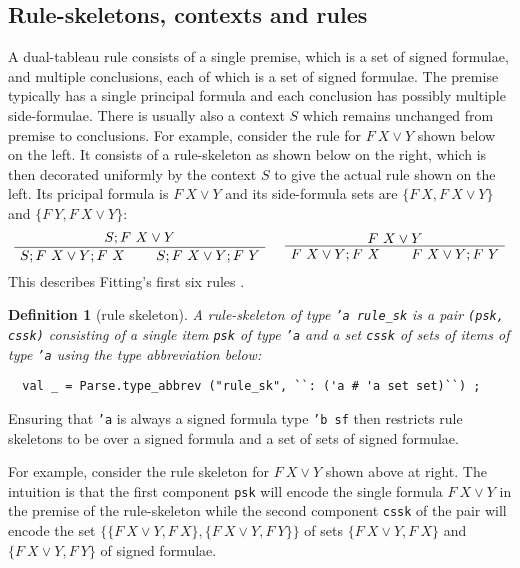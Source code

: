 \documentclass[a4paper]{article}
\newtheorem{definition}{Definition}
\begin{document}
\subsection{Rule-skeletons, contexts and rules}
A dual-tableau rule consists of a single premise,
which is a set of signed formulae,
and multiple conclusions, each of which is a set of signed formulae.
The premise typically has a single principal formula
and each conclusion has possibly multiple side-formulae. There is
usually also a context $S$ which remains unchanged from premise to
conclusions. For example, consider the rule for $F ~ X \lor Y$ shown
below on the left. It consists of a rule-skeleton as shown below on
the right, which is then decorated uniformly by the context $S$ to
give the actual rule shown on the left. Its pricipal formula is
$F~ X \lor Y$ and its side-formula sets are $\{F~X , F~ X \lor Y \}$
and $\{F~Y , F~ X \lor Y \}$:
\[
\rootAtTop
\AxiomC{$S ; F ~ X \lor Y; F ~ X$}
\AxiomC{$S ; F ~ X \lor Y; F ~ Y$}
\BinaryInfC{$S ; F ~ X \lor Y$}
\DisplayProof
\hspace{0.5cm}
\rootAtTop
\AxiomC{$F ~ X \lor Y; F ~ X$}
\AxiomC{$F ~ X \lor Y; F ~ Y$}
\BinaryInfC{$F ~ X \lor Y$}
\DisplayProof
\]
This describes Fitting's first six rules
\cite[Figure~1.6]{fitting-dual-tableau}.

\begin{definition}[rule skeleton]
  A rule-skeleton of type \texttt{'a rule\_sk} is a pair \texttt{(psk, cssk)}
  consisting of a single item \texttt{psk} of type \texttt{'a} and
  a set \texttt{cssk} of sets of items of type
  \texttt{'a} using the type abbreviation below:
\begin{verbatim}
  val _ = Parse.type_abbrev ("rule_sk", ``: ('a # 'a set set)``) ;
\end{verbatim}
\end{definition}

Ensuring  that
\texttt{'a} is always a signed formula type \texttt{'b sf} then restricts
rule skeletons to be over a signed formula and a set of sets of
signed formulae.

For example, consider the rule skeleton for
$F ~ X \lor Y$
shown above at right.
The intuition is that the first component
\texttt{psk}
will encode the single formula $F ~ X \lor Y$ in the premise of the
rule-skeleton while 
the second component
\texttt{cssk}
of the pair will encode the set 
$\{\{F ~ X \lor Y, F~ X\}, \{F ~ X \lor Y, F~ Y\}\}$ 
of sets
$\{F ~ X \lor Y, F~ X\}$
and
$\{F ~ X \lor Y, F~ Y\}$
of signed formulae.
\end{document}
